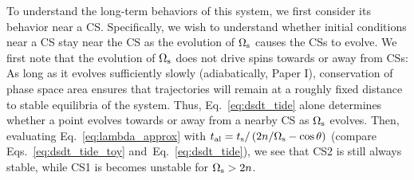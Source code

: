 \documentclass[
        fleqn,
        usenatbib,
    ]{mnras}
\newcommand*{\p}[1]{\left(#1\right)}
\begin{document}
To understand the long-term behaviors of this system, we first consider its
behavior near a CS\@. Specifically, we wish to understand whether initial
conditions near a CS stay near the CS as the evolution of $\Omega_{\rm s}$
causes the CSs to evolve. We first note that the evolution of
$\Omega_{\rm s}$ does not drive spins towards or away from CSs: As long as it
evolves sufficiently slowly (adiabatically, Paper I), conservation of
phase space area ensures that trajectories will remain at a roughly fixed
distance to stable equilibria of the system. Thus, Eq.~\eqref{eq:dsdt_tide}
alone determines whether a point evolves towards or away from a nearby CS as
$\Omega_{\rm s}$ evolves. Then, evaluating Eq.~\eqref{eq:lambda_approx} with
$t_{\rm al} = t_{\rm s} / \p{2n / \Omega_{\rm s} - \cos \theta}$ (compare
Eqs.~\ref{eq:dsdt_tide_toy} and~Eq.~\ref{eq:dsdt_tide}), we see that CS2 is
still always stable, while CS1 is becomes unstable for $\Omega_{\rm s} > 2n$.
\end{document}

